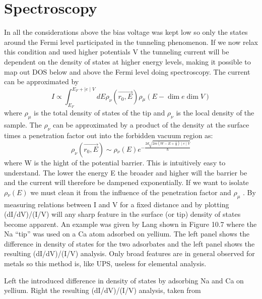 \section{Spectroscopy}
In all the considerations above the bias voltage was kept low so only the states around the Fermi level participated in the tunneling phenomenon. If we now relax this condition and used higher potentials V the tunneling current will be dependent on the density of states at higher energy levels, making it possible to map out DOS below and above the Fermi level doing spectroscopy. The  current can be approximated  by
\begin{equation}
I \propto \int_{E_F}^{E_F+\mid e \mid V} dE \rho_\nu(\overrightarrow{r_0,E}) \rho{}_\mu(E-\dim e \dim V)
\end{equation}
where $\rho_\mu$ is the total density of states of the tip and $\rho_\nu$ is the local density of the sample. The  $\rho_\nu$ can  be approximated by a product of the density at the surface times a penetration factor out into the forbidden vacuum region as:
\begin{equation}
 \rho_\nu(\overrightarrow{r_0,E}) \sim  \rho{}_\nu(E) e^{-\frac{2d\sqrt{2m(W-E+\frac{1}{2})\mid e \mid V}}{\hbar}}
\end{equation}
where W is the hight of the potential barrier.  This is intuitively easy to understand. The lower the energy E the broader and higher will the barrier be and the current will therefore be dampened exponentially. If we want to isolate $\rho{}_\nu(E) $ we must clean it from the influence of the penetration factor and $\rho_\mu$ . By measuring relations between I and V for a fixed distance and by plotting  (dI/dV)/(I/V) will any sharp feature in the surface (or tip) density of states become apparent. An example was given by Lang shown in Figure 10.7 where  the Na ``tip'' was used on a Ca atom adsorbed on yellium. The left panel shows the difference in density of states for the two adsorbates and the left panel shows the resulting (dI/dV)/(I/V) analysis. Only broad features are in general observed for metals so this method is, like UPS,  useless for elemental analysis.

\vspace*{9cm}

 Left the introduced difference in density of states by adsorbing Na and Ca on yellium. Right the resulting (dI/dV)/(I/V) analysis, taken from \cite{Lang}

\vspace{1cm}  



